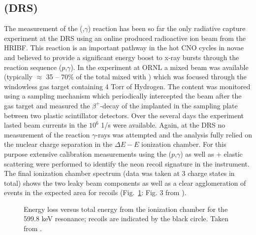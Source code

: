 \subsection{ (DRS) }
The measurement of the  (,$\gamma$) reaction has been so far the only radiative capture experiment at the DRS using an online produced radioactive ion beam from the HRIBF. This reaction is an important pathway in the hot CNO cycles in novae and believed to provide a significant energy boost to x-ray bursts through the reaction sequence ($p$,$\gamma$). In the experiment at ORNL a mixed  beam was available (typically  $\approx$ 35 -- 70\% of the total mixed with ) which was focused through the windowless gas target containing 4 Torr of Hydrogen. The  content was monitored using a sampling mechanism which periodically intercepted the beam after the gas target and measured the $\beta^+$-decay of the  implanted in the sampling plate between two plastic scintillator detectors. Over the several days the experiment lasted beam currents in the $10^6$ 1/s were available. Again, at the DRS no measurement of the reaction $\gamma$-rays was attempted and the analysis fully relied on the nuclear charge separation in the $\Delta{}E-E$ ionization chamber. For this purpose extensive calibration measurements using the ($p$,$\gamma$) as well as + elastic scattering were performed to identify the neon recoil signature in the instrument. The final ionization chamber spectrum (data was taken at 3 charge states in total) shows the two leaky beam components as well as a clear agglomeration of events in the expected area for  recoils (Fig.\ \ref{fig:chipp09a_3}: Fig. 3 from \cite{chip09a}).
\begin{figure}
\begin{center}
\caption{Energy loss versus total energy from the ionization chamber for the 599.8 keV resonance;  recoils are indicated by the black circle. Taken from \cite{chip09a}.}
\label{fig:chipp09a_3}
\end{center}
\end{figure}
